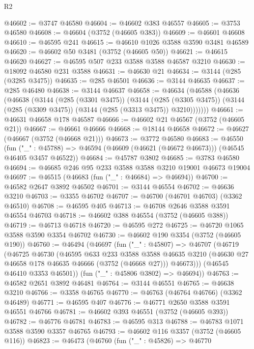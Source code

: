 \begin{lexlean}{R2}
\begin{coremodule}
@46602 := @3747 @46580
@46604 := @46602 @383 @46557
@46605 := @3753 @46580
@46608 := @46604 (@3752 (@46605 @383))
@46609 := @46601 @46608
@46610 := @46595 @241
@46615 := @46610 @1026 @3588 @3590 @3481 @46589
@46620 := @46602 @50 @3481 (@3752 (@46605 @50))
@46621 := @46615 @46620
@46627 := @46595 @507 @233 @3588 @3588 @46587 @3210
@46630 := @18092 @46580 @231 @3588
@46631 := @46630 @21
@46634 := @3144 (@285 (@3285 @3475))
@46635 := @285 @46501
@46636 := @3144 @46635
@46637 := @285 @46480
@46638 := @3144 @46637
@46658 := @46634
    (@46588
      (@46636
        (@46638
          (@3144
            (@285 (@3301 @3475))
            (@3144
              (@285 (@3305 @3475))
              (@3144 (@285 (@3309 @3475)) (@3144 (@285 (@3313 @3475)) @3210)))))))
@46661 := @46631 @46658 @178 @46587
@46666 := @46602 @21 @46567 (@3752 (@46605 @21))
@46667 := @46661 @46666
@46668 := @18144 @46658
@46672 := @46627 (@46667 (@3752 (@46668 @21)))
@46673 := @3772 @46580
@46683 := @46550
    (fun ("_" : @45788) => @46594 (@46609 (@46621 (@46672 @46673))) (@46545 @46405 @3457 @46522))
@46684 := @45787 @3802
@46685 := @3783 @46580
@46694 := @46685 @246 @95 @233 @3588 @3588 @3210 @19001 @46673 @19004
@46697 := @46515 (@46683 (fun ("_" : @46684) => @46694))
@46700 := @46582 @2647 @3892 @46502
@46701 := @3144 @46554
@46702 := @46636 @3210
@46703 := @3355 @46702
@46707 := @46700 (@46701 @46703) (@3362 @46510)
@46708 := @46595 @405
@46713 := @46708 @2646 @3588 @3591 @46554 @46703
@46718 := @46602 @388 @46554 (@3752 (@46605 @388))
@46719 := @46713 @46718
@46720 := @46595 @272
@46725 := @46720 @1065 @3588 @3590 @3354 @46702
@46730 := @46602 @190 @3354 (@3752 (@46605 @190))
@46760 := @46494
    (@46697
      (fun ("_" : @45807) =>
      @46707
        (@46719
          (@46725
            @46730
            (@46595
              @633
              @233
              @3588
              @3588
              @46635
              @3210
              (@46630 @27 @46658 @178 @46635 @46666 (@3752 (@46668 @27)))
              @46673)))
        (@46545 @46410 @3353 @46501))
      (fun ("_" : @45806 @3802) => @46694))
@46763 := @46582 @2651 @3892 @46481
@46764 := @3144 @46551
@46765 := @46638 @3210
@46766 := @3358 @46765
@46770 := @46763 (@46764 @46766) (@3362 @46489)
@46771 := @46595 @407
@46776 := @46771 @2650 @3588 @3591 @46551 @46766
@46781 := @46602 @393 @46551 (@3752 (@46605 @393))
@46782 := @46776 @46781
@46783 := @46595 @313
@46788 := @46783 @1071 @3588 @3590 @3357 @46765
@46793 := @46602 @116 @3357 (@3752 (@46605 @116))
@46823 := @46473
    (@46760
      (fun ("_" : @45826) =>
      @46770

\end{coremodule}
\end{lexlean}
